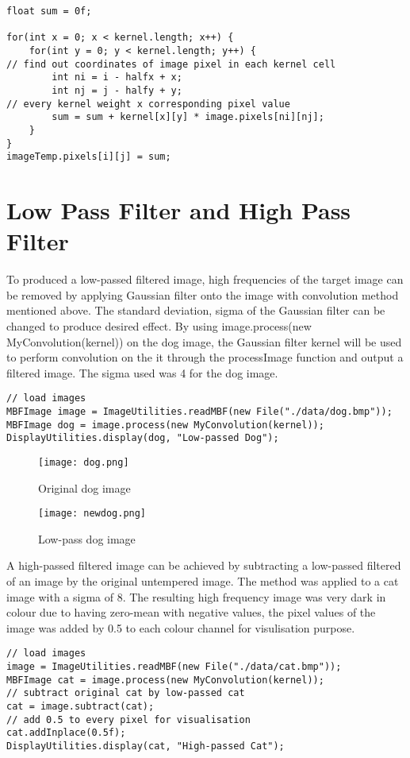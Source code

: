 \documentclass[journal]{IEEEtran}
\begin{document}
\begin{lstlisting}
float sum = 0f;
		
for(int x = 0; x < kernel.length; x++) {
	for(int y = 0; y < kernel.length; y++) {
// find out coordinates of image pixel in each kernel cell
		int ni = i - halfx + x;
		int nj = j - halfy + y;
// every kernel weight x corresponding pixel value
		sum = sum + kernel[x][y] * image.pixels[ni][nj];
	}
}
imageTemp.pixels[i][j] = sum;
\end{lstlisting}

\section{Low Pass Filter and High Pass Filter}

To produced a low-passed filtered image, high frequencies of the target image can be removed by applying Gaussian filter onto the image with convolution method mentioned above. The standard deviation, sigma of the Gaussian filter can be changed to produce desired effect.
By using image.process(new MyConvolution(kernel)) on the dog image, the Gaussian filter kernel will be used to perform convolution on the it through the processImage function and output a filtered image. The sigma used was 4 for the dog image.

\begin{lstlisting}
// load images
MBFImage image = ImageUtilities.readMBF(new File("./data/dog.bmp"));
MBFImage dog = image.process(new MyConvolution(kernel));
DisplayUtilities.display(dog, "Low-passed Dog");
\end{lstlisting}

\begin{figure}[!htb]
\centering
\texttt{[image: dog.png]}
\caption{Original dog image}
\end{figure}

\begin{figure}[!htb]
\centering
\texttt{[image: newdog.png]}
\caption{Low-pass dog image}
\end{figure}

A high-passed filtered image can be achieved by subtracting a low-passed filtered of an image by the original untempered image. The method was applied to a cat image with a sigma of 8. The resulting high frequency image was very dark in colour due to having zero-mean with negative values, the pixel values of the image was added by 0.5 to each colour channel for visulisation purpose.

\begin{lstlisting}
// load images
image = ImageUtilities.readMBF(new File("./data/cat.bmp"));
MBFImage cat = image.process(new MyConvolution(kernel));
// subtract original cat by low-passed cat
cat = image.subtract(cat);
// add 0.5 to every pixel for visualisation
cat.addInplace(0.5f);
DisplayUtilities.display(cat, "High-passed Cat");
\end{lstlisting}
\end{document}
